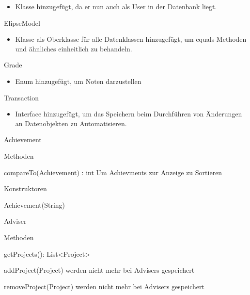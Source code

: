 \documentclass[parskip=full]{scrartcl}
\newcommand{\changeDescription}[1]{{\newline\color{black}\normalfont #1}}
\newcommand{\code}[1]{{\ttfamily #1}}
\begin{document}
\begin{itemPackage}
\begin{itemClass}
\begin{itemize}
  \item Klasse hinzugefügt, da er nun auch als \code{User} in der Datenbank
  liegt.
\end{itemize}
\item ElipseModel
\begin{itemize}
  \item Klasse als Oberklasse für alle Datenklassen hinzugefügt, um
  \code{equals}-Methoden und ähnliches einheitlich zu behandeln.
\end{itemize}
\item Grade
\begin{itemize}
  \item Enum hinzugefügt, um Noten darzustellen
\end{itemize}
\item Transaction
\begin{itemize}
  \item Interface hinzugefügt, um das Speichern beim Durchführen von Änderungen
  an Datenobjekten zu Automatisieren.
\end{itemize}
\item Achievement
\begin{itemClassSub}
\item Methoden
\begin{itemPlus}
\item compareTo(Achievement) : int \changeDescription{Um \code{Achievments} zur
Anzeige zu Sortieren }
\end{itemPlus}
\item Konstruktoren
\begin{itemPlus}
\item Achievement(String)
\end{itemPlus}
\end{itemClassSub}
\item Adviser
\item \begin{itemClassSub}
\item Methoden
\begin{itemPlus}
\item getProjects(): List<Project>
\end{itemPlus}
\begin{itemMinus}
\item addProject(Project) \changeDescription{\code{Projects} werden nicht mehr
bei \code{Advisers} gespeichert}
\item removeProject(Project)\changeDescription{\code{Projects} werden nicht mehr
bei \code{Advisers} gespeichert}
\end{itemMinus}

\end{itemClassSub}
\end{itemClass}
\end{itemPackage}
\end{document}
